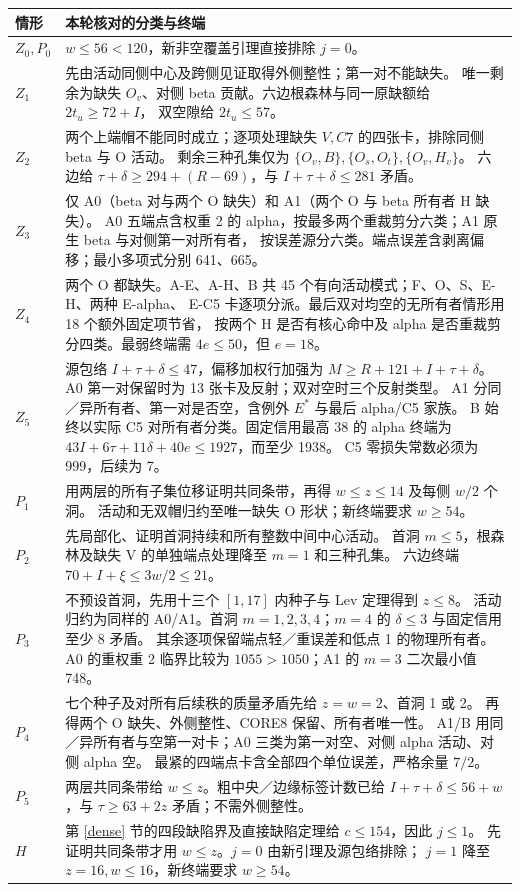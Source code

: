 \documentclass[11pt,a4paper]{article}
\begin{document}
\begin{longtable}{p{.12\linewidth}p{.79\linewidth}}
\toprule 情形 & 本轮核对的分类与终端\\\midrule\endhead
$Z_0,P_0$ & $w\le56<120$，新非空覆盖引理直接排除 $j=0$。\\
$Z_1$ & 先由活动同侧中心及跨侧见证取得外侧整性；第一对不能缺失。
唯一剩余为缺失 $O_v$、对侧 beta 贡献。六边根森林与同一原缺额给 $2t_u\ge72+I$，
双空隙给 $2t_u\le57$。\\
$Z_2$ & 两个上端帽不能同时成立；逐项处理缺失 $V,C7$ 的四张卡，排除同侧 beta 与 O 活动。
剩余三种孔集仅为 $\{O_v,B\},\{O_s,O_t\},\{O_v,H_v\}$。
六边给 $\tau+\delta\ge294+(R-69)$，与 $I+\tau+\delta\le281$ 矛盾。\\
$Z_3$ & 仅 A0（beta 对与两个 O 缺失）和 A1（两个 O 与 beta 所有者 H 缺失）。
A0 五端点含权重 2 的 alpha，按最多两个重裁剪分六类；A1 原生 beta 与对侧第一对所有者，
按误差源分六类。端点误差含剥离偏移；最小多项式分别 641、665。\\
$Z_4$ & 两个 O 都缺失。A-E、A-H、B 共 45 个有向活动模式；F、O、S、E-H、两种 E-alpha、
E-C5 卡逐项分派。最后双对均空的无所有者情形用 18 个额外固定项节省，
按两个 H 是否有核心命中及 alpha 是否重裁剪分四类。最弱终端需 $4e\le50$，但 $e=18$。\\
$Z_5$ & 源包络 $I+\tau+\delta\le47$，偏移加权行加强为 $M\ge R+121+I+\tau+\delta$。
A0 第一对保留时为 13 张卡及反射；双对空时三个反射类型。
A1 分同／异所有者、第一对是否空，含例外 $E^*$ 与最后 alpha/C5 家族。
B 始终以实际 C5 对所有者分类。固定信用最高 38 的 alpha 终端为
$43I+6\tau+11\delta+40e\le1927$，而至少 1938。
C5 零损失常数必须为 999，后续为 7。\\
$P_1$ & 用两层的所有子集位移证明共同条带，再得 $w\le z\le14$ 及每侧 $w/2$ 个洞。
活动和无双帽归约至唯一缺失 O 形状；新终端要求 $w\ge54$。\\
$P_2$ & 先局部化、证明首洞持续和所有整数中间中心活动。
首洞 $m\le5$，根森林及缺失 V 的单独端点处理降至 $m=1$ 和三种孔集。
六边终端 $70+I+\xi\le3w/2\le21$。\\
$P_3$ & 不预设首洞，先用十三个 $[1,17]$ 内种子与 Lev 定理得到 $z\le8$。
活动归约为同样的 A0/A1。首洞 $m=1,2,3,4$；$m=4$ 的 $\delta\le3$ 与固定信用至少 8 矛盾。
其余逐项保留端点轻／重误差和低点 1 的物理所有者。
A0 的重权重 2 临界比较为 $1055>1050$；A1 的 $m=3$ 二次最小值 748。\\
$P_4$ & 七个种子及对所有后续秩的质量矛盾先给 $z=w=2$、首洞 1 或 2。
再得两个 O 缺失、外侧整性、CORE8 保留、所有者唯一性。
A1/B 用同／异所有者与空第一对卡；A0 三类为第一对空、对侧 alpha 活动、对侧 alpha 空。
最紧的四端点卡含全部四个单位误差，严格余量 $7/2$。\\
$P_5$ & 两层共同条带给 $w\le z$。粗中央／边缘标签计数已给
$I+\tau+\delta\le56+w$，与 $\tau\ge63+2z$ 矛盾；不需外侧整性。\\
$H$ & 第 \ref{dense} 节的四段缺陷界及直接缺陷定理给 $c\le154$，因此 $j\le1$。
先证明共同条带才用 $w\le z$。$j=0$ 由新引理及源包络排除；
$j=1$ 降至 $z=16,w\le16$，新终端要求 $w\ge54$。\\\bottomrule
\end{longtable}
\end{document}
